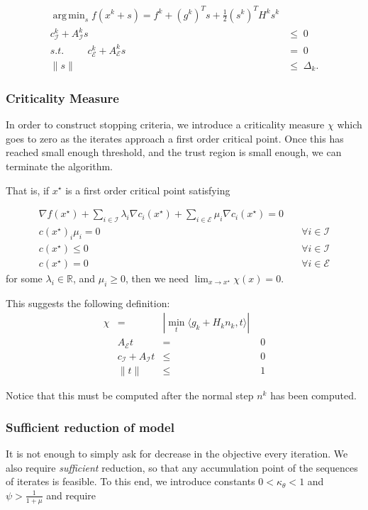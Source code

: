 \documentclass{article}
\DeclareMathOperator*{\argmin}{arg\,min}
\begin{document}
\begin{align*}
\argmin_s  f(x^k+s) = f^k + (g^k)^Ts + \frac 1 2 (s^k)^T H^ks^k  &\\
     c_{{\mathcal{I}}}^k + A_{{\mathcal{I}}}^ks       &\le \; 0  \\
s.t. \hspace{1cm} c_{{\mathcal{E}}}^k + A_{{\mathcal{E}}}^ks           &=\; 0 \\
     \| s \|                      &\le \; \Delta_k.
\end{align*}



\subsubsection{Criticality Measure}

In order to construct stopping criteria, we introduce a criticality measure $\chi$ which goes to zero as the iterates approach a first order critical point.
Once this has reached small enough threshold, and the trust region is small enough, we can terminate the algorithm.

That is, if $x^{\star}$ is a first order critical point satisfying

\begin{align*}
\nabla f(x^{\star}) + \sum_{i\in\mathcal I} \lambda_i \nabla c_i(x^{\star}) + \sum_{i\in \mathcal E} \mu_i \nabla c_i(x^{\star})  = 0 \\
c(x^{\star})_i \mu_i = 0 & \quad \forall i\in\mathcal I \\
c(x^{\star}) \le 0 & \quad \forall i\in\mathcal I\\
c(x^{\star}) = 0 & \quad \forall i\in\mathcal E
\end{align*}
for some $\lambda_i \in \mathbb R$, and $\mu_i \ge 0$, then we need $\lim_{x\to x^{\star}} \chi(x) = 0$.

This suggests the following definition:
\begin{align}
\label{critical}
\chi & = & |\min_t \langle g_k + H_kn_k, t\rangle| \\
& A_{\mathcal {E}}t &=& \; 0 \\
& c_{\mathcal {I}} + A_{\mathcal {I}}t &\le& \; 0 \\
& \| t \| &\le& \; 1
\end{align}

Notice that this must be computed after the normal step $n^k$ has been computed.


\subsubsection{Sufficient reduction of model}
It is not enough to simply ask for decrease in the objective every iteration.
We also require \emph{sufficient} reduction, so that any accumulation point of the sequences of iterates is feasible.
To this end, we introduce constants $0 < \kappa_{\theta} < 1$ and $\psi > \frac{1}{1+\mu}$ and require
\end{document}
